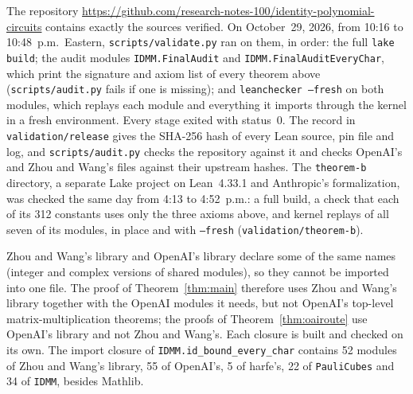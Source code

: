 \documentclass[11pt]{article}
\theoremstyle{definition}
\theoremstyle{remark}
\newcommand{\lean}[1]{\texttt{#1}}
\begin{document}
The repository \url{https://github.com/research-notes-100/identity-polynomial-circuits} contains exactly the
sources verified. On October~29, 2026, from 10:16 to 10:48~p.m.\ Eastern, \texttt{scripts/validate.py} ran on them,
in order: the full \lean{lake build}; the audit modules \lean{IDMM.FinalAudit} and
\lean{IDMM.FinalAuditEveryChar}, which print the signature and axiom list of every theorem above
(\texttt{scripts/audit.py} fails if one is missing); and
\lean{leanchecker --fresh} on both modules, which replays each module and everything it imports through the
kernel in a fresh environment. Every stage exited with status~0. The record in \texttt{validation/release} gives
the SHA-256 hash of every Lean source, pin file and log, and \texttt{scripts/audit.py} checks the repository
against it and checks OpenAI's and Zhou and Wang's files against their upstream hashes. The \texttt{theorem-b}
directory, a separate Lake project on Lean~4.33.1 and Anthropic's formalization, was checked the same day from
4:13 to 4:52~p.m.: a full build, a check that each of its 312 constants uses only the three axioms above, and
kernel replays of all seven of its modules, in place and with \lean{--fresh} (\texttt{validation/theorem-b}).

Zhou and Wang's library and OpenAI's library declare some of the same names (integer and complex versions of shared
modules), so they cannot be imported into one file. The proof of Theorem~\ref{thm:main} therefore uses Zhou and
Wang's library together with the OpenAI modules it needs, but not OpenAI's top-level matrix-multiplication
theorems; the proofs of Theorem~\ref{thm:oairoute} use OpenAI's library and not Zhou and Wang's. Each closure is
built and checked on its own. The import closure of \lean{IDMM.id\_bound\_every\_char} contains 52 modules of Zhou
and Wang's library, 55 of OpenAI's, 5 of harfe's, 22 of \lean{PauliCubes} and 34 of \lean{IDMM}, besides Mathlib.
\end{document}
